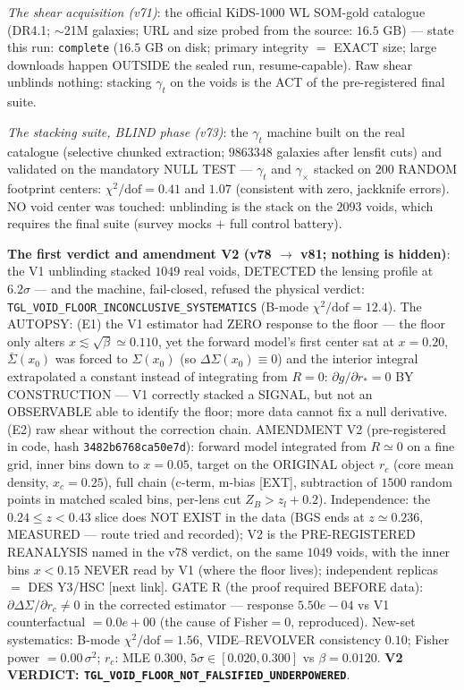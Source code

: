 \documentclass[11pt]{article}
\theoremstyle{definition}\newtheorem{deriv}{Derivation}
\begin{document}
\emph{The shear acquisition (v71)}: the official KiDS-1000 WL SOM-gold catalogue (DR4.1; $\sim$21M galaxies; URL and size probed from the source: $16.5$ GB) --- state this run: \texttt{complete} ($16.5$ GB on disk; primary integrity $=$ EXACT size; large downloads happen OUTSIDE the sealed run, resume-capable). Raw shear unblinds nothing: stacking $\gamma_t$ on the voids is the ACT of the pre-registered final suite.

\emph{The stacking suite, BLIND phase (v73)}: the $\gamma_t$ machine built on the real catalogue (selective chunked extraction; $9863348$ galaxies after lensfit cuts) and validated on the mandatory NULL TEST --- $\gamma_t$ and $\gamma_\times$ stacked on $200$ RANDOM footprint centers: $\chi^2/\mathrm{dof}=0.41$ and $1.07$ (consistent with zero, jackknife errors). NO void center was touched: unblinding is the stack on the $2093$ voids, which requires the final suite (survey mocks $+$ full control battery).

\textbf{The first verdict and amendment V2 (v78 $\to$ v81; nothing is hidden)}: the V1 unblinding stacked $1049$ real voids, DETECTED the lensing profile at $6.2\sigma$ --- and the machine, fail-closed, refused the physical verdict: \texttt{TGL\_VOID\_FLOOR\_INCONCLUSIVE\_SYSTEMATICS} (B-mode $\chi^2/\mathrm{dof}=12.4$). The AUTOPSY: (E1) the V1 estimator had ZERO response to the floor --- the floor only alters $x\lesssim\sqrt{\beta}\simeq0.110$, yet the forward model's first center sat at $x=0.20$, $\bar\Sigma(x_0)$ was forced to $\Sigma(x_0)$ (so $\Delta\Sigma(x_0)\equiv0$) and the interior integral extrapolated a constant instead of integrating from $R=0$: $\partial g/\partial r_*=0$ BY CONSTRUCTION --- V1 correctly stacked a SIGNAL, but not an OBSERVABLE able to identify the floor; more data cannot fix a null derivative. (E2) raw shear without the correction chain. AMENDMENT V2 (pre-registered in code, hash \texttt{3482b6768ca50e7d}): forward model integrated from $R\simeq0$ on a fine grid, inner bins down to $x=0.05$, target on the ORIGINAL object $r_c$ (core mean density, $x_c=0.25$), full chain (c-term, m-bias [EXT], subtraction of $1500$ random points in matched scaled bins, per-lens cut $Z_B>z_l+0.2$). Independence: the $0.24\le z<0.43$ slice does NOT EXIST in the data (BGS ends at $z\simeq0.236$, MEASURED --- route tried and recorded); V2 is the PRE-REGISTERED REANALYSIS named in the v78 verdict, on the same $1049$ voids, with the inner bins $x<0.15$ NEVER read by V1 (where the floor lives); independent replicas $=$ DES Y3/HSC [next link]. GATE R (the proof required BEFORE data): $\partial\Delta\Sigma/\partial r_c\neq0$ in the corrected estimator --- response $5.50e-04$ vs V1 counterfactual $= 0.0e+00$ (the cause of Fisher$=0$, reproduced). New-set systematics: B-mode $\chi^2/\mathrm{dof}=1.56$, VIDE--REVOLVER consistency $0.10$; Fisher power $=0.00\,\sigma^2$; $r_c$: MLE $0.300$, $5\sigma\in[0.020,0.300]$ vs $\beta=0.0120$. \textbf{V2 VERDICT: \texttt{TGL\_VOID\_FLOOR\_NOT\_FALSIFIED\_UNDERPOWERED}}.
\end{document}
